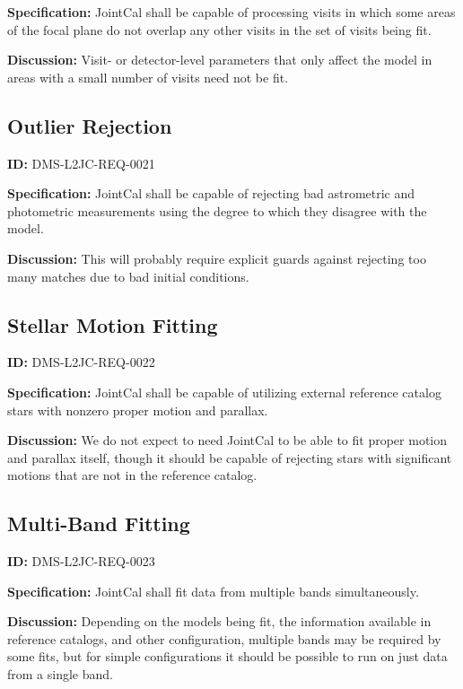 \documentclass[SE,toc,lsstdraft]{lsstdoc}
\begin{document}
\textbf{Specification:}
JointCal shall be capable of processing visits in which some areas of the focal plane do not overlap any other visits in the set of visits being fit.

\textbf{Discussion:}
Visit- or detector-level parameters that only affect the model in areas with a small number of visits need not be fit.

\subsection{Outlier Rejection}

\label{DMS-L2JC-REQ-0021}
\textbf{ID:} DMS-L2JC-REQ-0021

\textbf{Specification:}
JointCal shall be capable of rejecting bad astrometric and photometric measurements using the degree to which they disagree with the model.

\textbf{Discussion:}
This will probably require explicit guards against rejecting too many matches due to bad initial conditions.

\subsection{Stellar Motion Fitting}

\label{DMS-L2JC-REQ-0022}
\textbf{ID:} DMS-L2JC-REQ-0022

\textbf{Specification:}
JointCal shall be capable of utilizing external reference catalog stars with nonzero proper motion and parallax.

\textbf{Discussion:}
We do not expect to need JointCal to be able to fit proper motion and parallax itself, though it should be capable of rejecting stars with significant motions that are not in the reference catalog.

\subsection{Multi-Band Fitting}

\label{DMS-L2JC-REQ-0023}
\textbf{ID:} DMS-L2JC-REQ-0023

\textbf{Specification:}
JointCal shall fit data from multiple bands simultaneously.

\textbf{Discussion:}
Depending on the models being fit, the information available in reference catalogs, and other configuration, multiple bands may be required by some fits, but for simple configurations it should be possible to run on just data from a single band.
\end{document}
